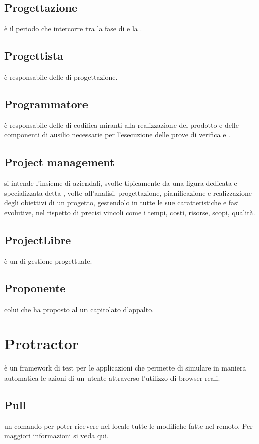 \documentclass[12pt,a4paper]{article}
\begin{document}
\subsection{Progettazione} 
 è il periodo che intercorre tra la fase di \FAD e la \RP.

\subsection{Progettista} 
 è responsabile delle  di progettazione.

\subsection{Programmatore} 
 è responsabile delle  di codifica miranti alla realizzazione del prodotto e delle componenti di ausilio necessarie per l'esecuzione delle prove di verifica e .

\subsection{Project management} 
 si intende l'insieme di  aziendali, svolte tipicamente da una figura dedicata e specializzata detta , volte all'analisi, progettazione, pianificazione e realizzazione degli obiettivi di un progetto, gestendolo in tutte le sue caratteristiche e fasi evolutive, nel rispetto di precisi vincoli come i tempi, costi, risorse, scopi, qualità.

\subsection{ProjectLibre} 
 è un  di gestione progettuale.

\subsection{Proponente} 
 colui che ha proposto al  un capitolato d'appalto.
 
 \section{Protractor}
 è un framework di test per le applicazioni  che permette di simulare in maniera automatica le azioni di un utente attraverso l'utilizzo di browser reali.

\subsection{Pull} 
 un comando  per poter ricevere nel locale tutte le modifiche fatte nel  remoto. Per maggiori informazioni si veda \href{https://git-scm.com/docs/}{qui}.
\end{document}
